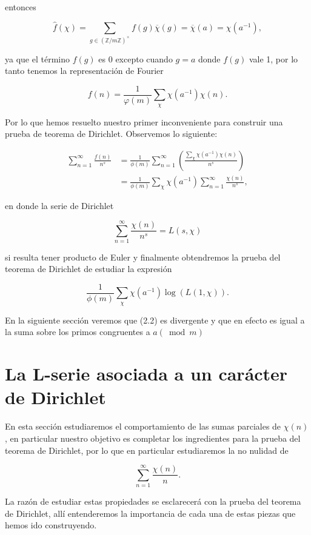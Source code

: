 entonces

$$
\hat{f}(\chi)=\sum_{g \in(\mathbb{Z} / m \mathbb{Z})^{\times}} f(g) \overline{\chi}(g)=\overline{\chi}(a)=\chi\left(a^{-1}\right),
$$

 ya que el término $f(g)$ es $0$ excepto cuando $g=a$ donde $f(g)$ vale 1, por lo tanto tenemos la representación de Fourier

$$
\boxed{f(n)=\frac{1}{\varphi(m)} \sum_\chi \chi\left(a^{-1}\right) \chi(n).
}
$$

Por lo que hemos resuelto nuestro primer inconveniente para construir una prueba de teorema de Dirichlet. Observemos lo siguiente:

\begin{align*}
    \sum_{n=1}^{\infty}\frac{f(n)}{n^s}&=\frac{1}{\phi(m)}\sum_{n=1}^{\infty} \left(\frac{\displaystyle\sum_{\chi}\chi(a^{-1})\chi(n)}{n^s}\right)\\
    &=\frac{1}{\phi(m)}\sum_{\chi}\chi(a^{-1})\sum_{n=1}^{\infty}\frac{\chi(n)}{n^s}
,\end{align*}

en donde la serie de Dirichlet

$$\sum_{n=1}^{\infty} \frac{\chi(n)}{n^s}=L(s,\chi)$$

si resulta tener producto de Euler y finalmente obtendremos la prueba del teorema de Dirichlet de estudiar la expresión

\begin{equation}
\frac{1}{\phi(m)}\sum_{\chi}\chi(a^{-1})\log(L(1,\chi)).
\end{equation}

En la siguiente sección veremos que (2.2) es divergente y que en efecto es igual a la suma sobre los primos congruentes a $a (\bmod{m})$

\section{La L-serie asociada a un carácter de Dirichlet}

En esta sección estudiaremos el comportamiento de las sumas parciales de $\chi(n)$, en particular nuestro objetivo es completar los ingredientes para la prueba del teorema de Dirichlet, por lo que en particular estudiaremos la no nulidad de 

$$\sum_{n=1}^{\infty} \frac{\chi(n)}{n}.$$

La razón de estudiar estas propiedades se esclarecerá con la prueba del teorema de Dirichlet, allí entenderemos la importancia de cada una de estas piezas que hemos ido construyendo.

